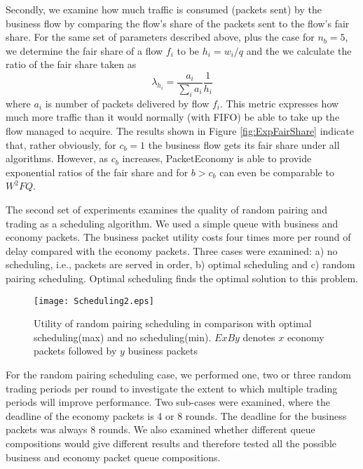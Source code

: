 \documentclass[letterpaper,10pt]{llncs}
\newcommand{\hla}[1]{\hl{#1}}
\renewcommand{\hla}[1]{#1}
\begin{document}
Secondly, we examine how much traffic is consumed (packets sent) by the business flow by comparing the flow's share of the packets sent to the flow's fair share. For the same set of parameters described above, plus the case for $n_b=5$, we determine the fair share of a flow $f_i$ to be $h_i=w_i/q$ and the we calculate the ratio of the fair share taken as
\[ 
\lambda_{h_i}=\frac{a_i}{\sum_{i}^{}{a_i}}\frac{1}{h_i}
\]
where $a_i$ is number of packets delivered by flow $f_i$. This metric expresses how much more traffic than it would normally (with FIFO) be able to take up the flow managed to acquire. 
The results shown in Figure \ref{fig:ExpFairShare} indicate that, rather obviously, for $c_b=1$ the business flow gets its fair share under all algorithms. However, as $c_b$ increases, PacketEconomy is able to provide exponential ratios of the fair share and for \hla{$b>c_b$} can even be comparable to $W^{2}FQ$.




The \hla{second} set of experiments examines the quality of random pairing and trading as a scheduling algorithm. We used a simple queue with business and economy packets. The business packet utility costs four times more per round of delay compared with the economy packets. Three cases were examined: a) no scheduling, i.e., packets are served in order, b) optimal scheduling and c) random pairing scheduling. Optimal scheduling finds the optimal solution to this problem. 

\begin{figure}[h!]
\begin{minipage}[b]{\linewidth}
\centering
\texttt{[image: Scheduling2.eps]}
\caption{Utility of random pairing scheduling in comparison with optimal scheduling(max) and no scheduling(min). $ExBy$ denotes $x$ economy packets followed by $y$ business packets}
\label{fig:Scheduling}
\end{minipage}
\end{figure}

For the random pairing scheduling case, we performed one, two or three random trading periods per round to investigate the extent to which multiple trading periods will improve performance. Two sub-cases were examined, where the deadline of the economy packets is 4 or 8 rounds. The deadline for the business packets was always 8 rounds. We also examined whether different queue compositions would give different results and therefore tested all the possible business and economy packet queue compositions.
\end{document}
